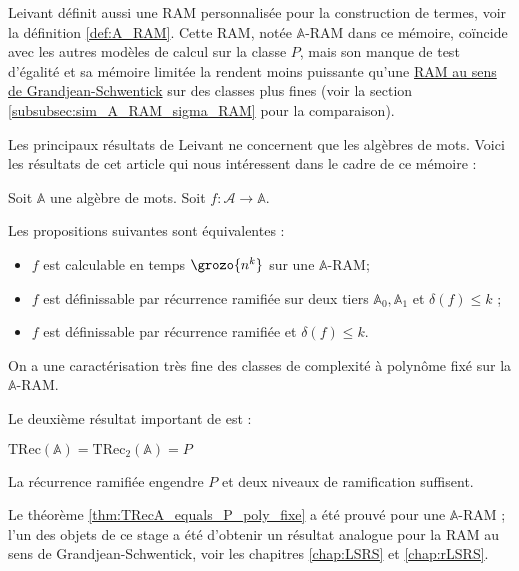 \documentclass{report}
\newcommand{\bbA}{\mathbb{A}}
\newcommand{\TRec}[1]{\text{TRec}\left(\mathbb{#1}\right)}
\newcommand{\TRecd}[1]{\text{TRec}_{2}\left(\mathbb{#1}\right)}
\begin{document}
			
			Leivant définit aussi une RAM personnalisée pour la construction de termes, voir la définition \ref{def:A_RAM}. Cette RAM, notée $\bbA$-RAM dans ce mémoire, coïncide avec les autres modèles de calcul sur la classe $P$, mais son manque de test d'égalité et sa mémoire limitée la rendent moins puissante qu'une \hyperref[def:sigma_RAM]{RAM au sens de Grandjean-Schwentick} \cite{GrandjeanSchwentick2002} sur des classes plus fines (voir la section \ref{subsubsec:sim_A_RAM_sigma_RAM} pour la comparaison).
			
			\espace
			
			Les principaux résultats de Leivant ne concernent que les algèbres de mots. Voici les résultats de cet article \cite{Leivant1995} qui nous intéressent dans le cadre de ce mémoire :
			
			\begin{theorem}
				\label{thm:TRecA_equals_P_poly_fixe}
				Soit $\bbA$ une algèbre de mots. Soit $f : \mathcal{A} \to \bbA $.
				
				Les propositions suivantes sont équivalentes :
	
				\begin{itemize}[itemsep=-1mm]
					\item 	$f$ est calculable en temps $\grozo{n^k}$ sur une $\bbA$-RAM;
					\item 	$f$ est définissable par récurrence ramifiée sur deux tiers $\bbA_0, \bbA_1$ et $\delta(f) \leq k$ ;
					\item 	$f$ est définissable par récurrence ramifiée et $\delta(f) \leq k$.
				\end{itemize}
			\end{theorem}
			
			On a une caractérisation très fine des classes de complexité à polynôme fixé sur la $\bbA$-RAM.
			
			Le deuxième résultat important de \cite{Leivant1995} est :
			
			\begin{theorem}
				\label{thm:TRecA_equals_P}
				$\TRec{A} = \TRecd{A} = P$
			\end{theorem}
			
			La récurrence ramifiée engendre $P$ et deux niveaux de ramification suffisent.
		
			Le théorème \ref{thm:TRecA_equals_P_poly_fixe} a été prouvé pour une $\bbA$-RAM ; l'un des objets de ce stage a été d'obtenir un résultat analogue pour la RAM au sens de Grandjean-Schwentick, voir les chapitres \ref{chap:LSRS} et \ref{chap:rLSRS}.
			
\end{document}
